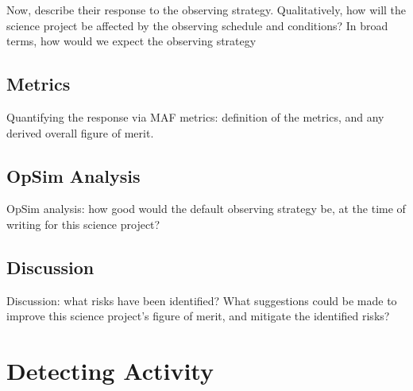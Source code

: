 Now, describe their response to the observing strategy. Qualitatively,
how will the science project be affected by the observing schedule and
conditions? In broad terms, how would we expect the observing strategy




\subsection{Metrics}
\label{sec:\secname:metrics}

Quantifying the response via MAF metrics: definition of the metrics,
and any derived overall figure of merit.



\subsection{OpSim Analysis}
\label{sec:\secname:analysis}

OpSim analysis: how good would the default observing strategy be, at
the time of writing for this science project?



\subsection{Discussion}
\label{sec:\secname:discussion}

Discussion: what risks have been identified? What suggestions could be
made to improve this science project's figure of merit, and mitigate
the identified risks?

\navigationbar


\section{Detecting Activity}
\def\secname{\chpname:activity}\label{sec:\secname}


